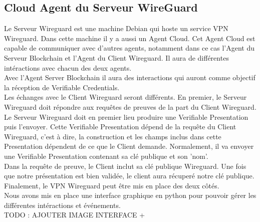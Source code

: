\documentclass[12pt, openany]{report}
\begin{document}
\subsection{Cloud Agent du Serveur WireGuard}
\noindent 
\begin{flushleft}
Le Serveur Wireguard est une machine Debian qui hoste un service VPN Wireguard.  Dans cette machine il y a aussi un Agent Cloud. Cet Agent Cloud est capable de communiquer avec d'autres agents, notamment dans ce cas l'Agent du Serveur Blockchain et l'Agent du Client Wireguard. Il aura de différentes intéractions avec chacun des deux agents. \\
\vspace{2mm}
Avec l'Agent Server Blockchain il aura des interactions qui auront comme objectif la réception de Verifiable Credentials. \\
Les échanges avec le Client Wireguard seront différents. En premier, le Serveur Wireguard doit répondre aux requêtes de preuves de la part du Client Wireguard. Le Serveur Wireguard doit en premier lieu produire une Verifiable Presentation puis l'envoyer. Cette Verifiable Presentation dépend de la requête du Client Wireguard, c'est à dire, la construction et les champs inclus dans cette Presentation dépendent de ce que le Client demande. Normalement, il va envoyer une Verifiable Presentation contenant sa clé publique et son 'nom'. \\
Dans la requête de preuve, le Client inclut sa clé publique Wireguard. Une fois que notre présentation est bien validée, le client aura récuperé notre clé publique. Finalement, le VPN Wireguard peut être mis en place des deux côtés. \\
\vspace{2mm}
Nous avons mis en place une interface graphique en python pour pouvoir gérer les différentes intéractions et événements.\\
TODO : AJOUTER IMAGE INTERFACE + 
\end{flushleft}
\end{document}
